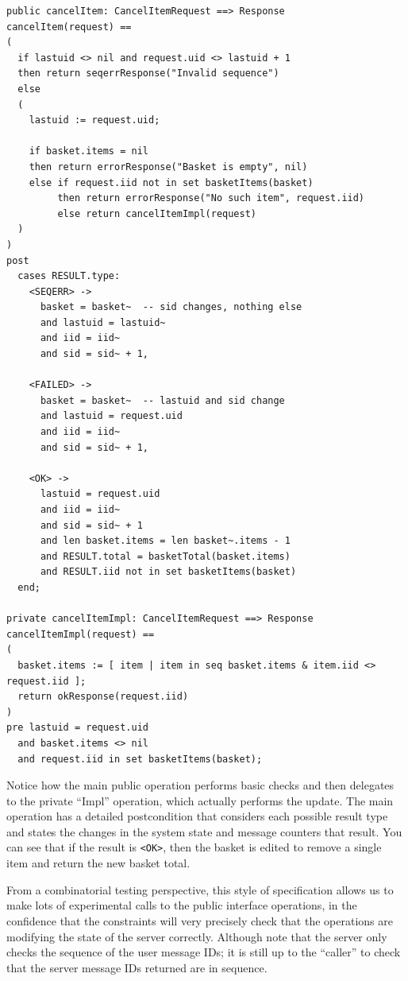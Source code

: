 \documentclass{overturerepchap}
\begin{document}
\scriptsize
\begin{lstlisting}
public cancelItem: CancelItemRequest ==> Response
cancelItem(request) ==
(
  if lastuid <> nil and request.uid <> lastuid + 1
  then return seqerrResponse("Invalid sequence")
  else
  (
    lastuid := request.uid;

    if basket.items = nil
    then return errorResponse("Basket is empty", nil)
    else if request.iid not in set basketItems(basket)
         then return errorResponse("No such item", request.iid)
         else return cancelItemImpl(request)
  )
)
post
  cases RESULT.type:
    <SEQERR> ->
      basket = basket~  -- sid changes, nothing else
      and lastuid = lastuid~
      and iid = iid~
      and sid = sid~ + 1,

    <FAILED> ->
      basket = basket~  -- lastuid and sid change
      and lastuid = request.uid
      and iid = iid~
      and sid = sid~ + 1,

    <OK> ->
      lastuid = request.uid
      and iid = iid~
      and sid = sid~ + 1
      and len basket.items = len basket~.items - 1
      and RESULT.total = basketTotal(basket.items)
      and RESULT.iid not in set basketItems(basket)
  end;

private cancelItemImpl: CancelItemRequest ==> Response
cancelItemImpl(request) ==
(
  basket.items := [ item | item in seq basket.items & item.iid <> request.iid ];
  return okResponse(request.iid)
)
pre lastuid = request.uid
  and basket.items <> nil
  and request.iid in set basketItems(basket);
\end{lstlisting}
\normalsize

\noindent Notice how the main public operation performs basic checks and then
delegates to the private ``Impl'' operation, which actually performs the update. The
main operation has a detailed postcondition that considers
each possible result type and states the changes in the system state and
message counters that result. You can see that if the result is \texttt{<OK>},
then the basket is edited to remove a single item and return the new basket
total.

From a combinatorial testing perspective, this style of specification allows us
to make lots of experimental calls to the public interface operations, in the
confidence that the constraints will very precisely check that the operations
are modifying the state of the server correctly. Although note that the server
only checks the sequence of the user message IDs; it is still up to the
``caller'' to check that the server message IDs returned are in sequence.
\end{document}
